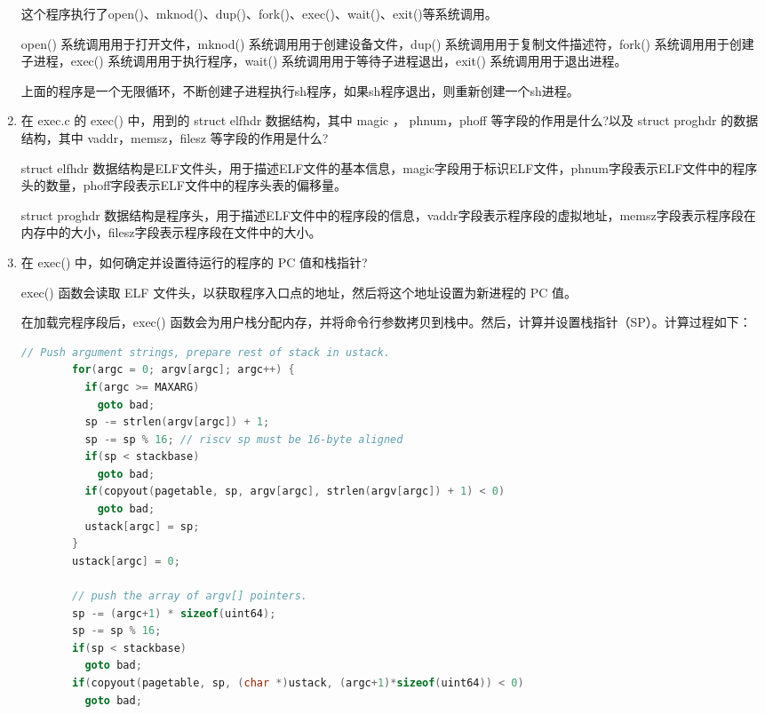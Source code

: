 \documentclass[UTF8]{article}
\begin{document}
\begin{enumerate}
    这个程序执行了open()、mknod()、dup()、fork()、exec()、wait()、exit()等系统调用。

    open() 系统调用用于打开文件，mknod() 系统调用用于创建设备文件，dup() 系统调用用于复制文件描述符，fork() 系统调用用于创建子进程，exec() 系统调用用于执行程序，wait() 系统调用用于等待子进程退出，exit() 系统调用用于退出进程。

    上面的程序是一个无限循环，不断创建子进程执行sh程序，如果sh程序退出，则重新创建一个sh进程。

    \item 在 exec.c 的 exec() 中，用到的 struct elfhdr 数据结构，其中 magic ， phnum，phoff 等字段的作用是什么?以及 struct proghdr 的数据结构，其中 vaddr，memsz，filesz 等字段的作用是什么?
    
    struct elfhdr 数据结构是ELF文件头，用于描述ELF文件的基本信息，magic字段用于标识ELF文件，phnum字段表示ELF文件中的程序头的数量，phoff字段表示ELF文件中的程序头表的偏移量。

    struct proghdr 数据结构是程序头，用于描述ELF文件中的程序段的信息，vaddr字段表示程序段的虚拟地址，memsz字段表示程序段在内存中的大小，filesz字段表示程序段在文件中的大小。

    \item 在 exec() 中，如何确定并设置待运行的程序的 PC 值和栈指针?
    
    exec() 函数会读取 ELF 文件头，以获取程序入口点的地址，然后将这个地址设置为新进程的 PC 值。

    在加载完程序段后，exec() 函数会为用户栈分配内存，并将命令行参数拷贝到栈中。然后，计算并设置栈指针（SP）。计算过程如下：

    \begin{lstlisting}[language=C]
        // Push argument strings, prepare rest of stack in ustack.
        for(argc = 0; argv[argc]; argc++) {
          if(argc >= MAXARG)
            goto bad;
          sp -= strlen(argv[argc]) + 1;
          sp -= sp % 16; // riscv sp must be 16-byte aligned
          if(sp < stackbase)
            goto bad;
          if(copyout(pagetable, sp, argv[argc], strlen(argv[argc]) + 1) < 0)
            goto bad;
          ustack[argc] = sp;
        }
        ustack[argc] = 0;
        
        // push the array of argv[] pointers.
        sp -= (argc+1) * sizeof(uint64);
        sp -= sp % 16;
        if(sp < stackbase)
          goto bad;
        if(copyout(pagetable, sp, (char *)ustack, (argc+1)*sizeof(uint64)) < 0)
          goto bad;
    \end{lstlisting}


\end{enumerate}
\end{document}
